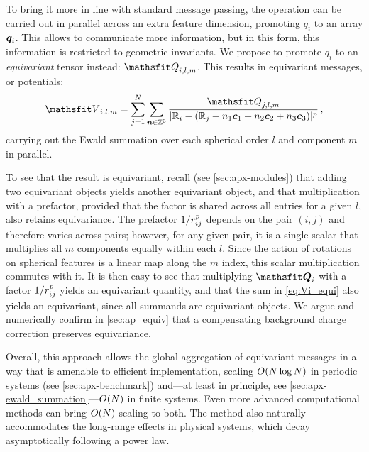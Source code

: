 \documentclass[10pt]{article} %
\newcommand{\CL}[1]{#1}
\newcommand{\ML}[1]{#1}
\begin{document}
To bring it more in line with standard message passing, the operation can be carried out in parallel across an extra feature dimension, promoting $q_i$ to an array ${\bm{q}}_i$. This allows to communicate more information, but in this form, this information is restricted to geometric invariants.
We propose to promote $q_i$ to an \emph{equivariant} tensor instead: $\etQ_{i,l,m}$. This results in equivariant messages, or potentials:
\begin{equation}
  \etV_{i,l,m} = \sum_{j=1}^N \sum_{\offset\in\wholes^3} \frac{\etQ_{j,l,m}}{|\R_i - (\R_j + n_1 \vc_1 + n_2 \vc_2 + n_3 \vc_3 )|^p} \,, \label{eq:Vi_equi}
\end{equation}
carrying out the Ewald summation over each spherical order $l$ and component $m$ in parallel.

To see that the result is equivariant, recall (see \cref{sec:apx-modules}) that adding two equivariant objects yields another equivariant object, and that multiplication with a prefactor, provided that the factor is shared across all entries for a given $l$, also retains equivariance. \CL{The prefactor $1/r_{ij}^p$ depends on the pair $(i,j)$ and therefore varies across pairs; however, for any given pair, it is a single scalar that multiplies all $m$ components equally within each $l$. Since the action of rotations on spherical features is a linear map along the $m$ index, this scalar multiplication commutes with it.} It is then easy to see that multiplying $\tQ_i$ with a factor $1/r_{ij}^p$ yields an equivariant quantity, and that the sum in \cref{eq:Vi_equi} also yields an equivariant, since all summands are equivariant objects. We argue and numerically confirm in \cref{sec:ap_equiv} that a compensating background charge correction preserves equivariance.

Overall, this approach allows the global aggregation of equivariant messages in a way that is amenable to efficient implementation, scaling $O(N \log N)$ in periodic systems \ML{(see \cref{sec:apx-benchmark})} and---at least in principle, see \cref{sec:apx-ewald_summation}---$O(N)$ in finite systems. Even more advanced computational methods can bring $O(N)$ scaling to both. The method also naturally accommodates the long-range effects in physical systems, which decay asymptotically following a power law.

\section{\lorem}
\end{document}
